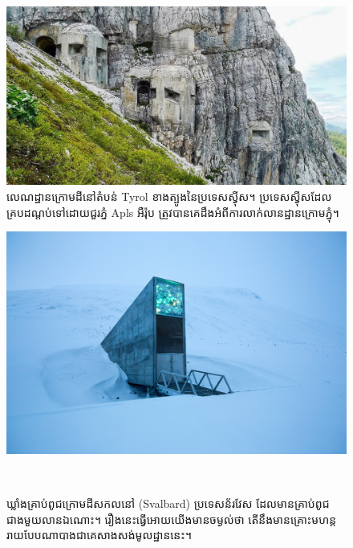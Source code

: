 \documentclass[10pt,twocolumn,letterpaper]{article}
\begin{document}
\begin{figure}[t]
\begin{center}
   \includegraphics[width=1\linewidth]{tyrol.jpg}
\end{center}
   \caption{លេណដ្ឋានក្រោមដីនៅតំបន់ Tyrol ខាងត្បូងនៃប្រទេសស្វុីស។ ប្រទេសស្វុីសដែលគ្របដណ្តប់ទៅដោយជួរភ្នំ Apls អឺរ៉ុប ត្រូវបានគេដឹងអំពីការលាក់លានដ្ឋានក្រោមភ្នុំ\cite{32}។}
\label{fig:7}
\label{fig:onecol}
\end{figure}

\begin{figure}[t]
\begin{center}
   \includegraphics[width=1\linewidth]{svalbard.jpg}
\end{center}
   \caption{ឃ្លាំងគ្រាប់ពូជក្រោមដីសកលនៅ (Svalbard) ប្រទេសន័រវែស ដែលមានគ្រាប់ពូជជាងមួយលានឯណោះ\cite{24}។ រឿងនេះធ្វើអោយយើងមានចម្ងល់ថា តើនឹងមានគ្រោះមហន្តរាយបែបណាបាងជាគេសាងសង់មូលដ្ឋាននេះ។}​
\label{fig:8}
\label{fig:onecol}
\end{figure}
\end{document}
